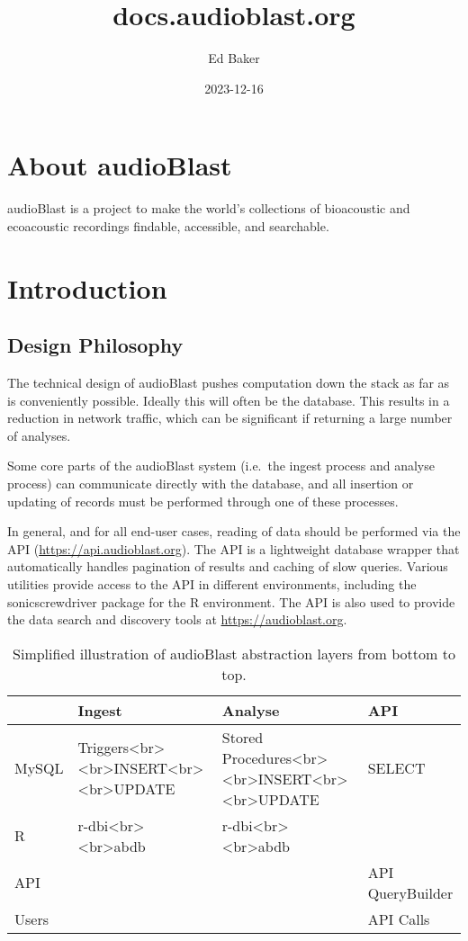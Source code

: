 \documentclass[
]{book}
\title{docs.audioblast.org}
\author{Ed Baker}
\date{2023-12-16}
\begin{document}
\maketitle

{
\setcounter{tocdepth}{1}
\tableofcontents
}
\hypertarget{about-audioblast}{%
\chapter{About audioBlast}\label{about-audioblast}}

audioBlast is a project to make the world's collections of bioacoustic and ecoacoustic recordings findable, accessible, and searchable.

\hypertarget{introduction}{%
\chapter{Introduction}\label{introduction}}

\hypertarget{design-philosophy}{%
\section{Design Philosophy}\label{design-philosophy}}

The technical design of audioBlast pushes computation down the stack as far as is conveniently possible. Ideally this will often be the database. This results in a reduction in network traffic, which can be significant if returning a large number of analyses.

Some core parts of the audioBlast system (i.e.~the ingest process and analyse process) can communicate directly with the database, and all insertion or updating of records must be performed through one of these processes.

In general, and for all end-user cases, reading of data should be performed via the API (\url{https://api.audioblast.org}). The API is a lightweight database wrapper that automatically handles pagination of results and caching of slow queries. Various utilities provide access to the API in different environments, including the sonicscrewdriver package for the R environment. The API is also used to provide the data search and discovery tools at \url{https://audioblast.org}.

\begin{table}

\caption{\label{tab:unnamed-chunk-1}Simplified illustration of audioBlast abstraction layers from 
  bottom to top.}
\centering
\begin{tabular}[t]{llll}
\toprule
  & Ingest & Analyse & API\\
\midrule
MySQL & Triggers<br><br>INSERT<br><br>UPDATE & Stored Procedures<br><br>INSERT<br><br>UPDATE & SELECT\\
R & r-dbi<br><br>abdb & r-dbi<br><br>abdb & \\
API &  &  & API QueryBuilder\\
Users &  &  & API Calls\\
\bottomrule
\end{tabular}
\end{table}
\end{document}
